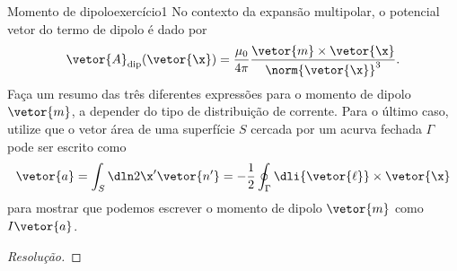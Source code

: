 \begin{exercício}{Momento de dipolo}{exercício1}
    No contexto da expansão multipolar, o potencial vetor do termo de dipolo é dado por
    \begin{equation*}
        \vetor{A}_{\mathrm{dip}}(\vetor{\x}) = \frac{\mu_0}{4\pi} \frac{\vetor{m}\times\vetor{\x}}{\norm{\vetor{\x}}^3}.
    \end{equation*}
    Faça um resumo das três diferentes expressões para o momento de dipolo \(\vetor{m}\), a depender do tipo de distribuição de corrente. Para o último caso, utilize que o vetor área de uma superfície \(S\) cercada por um acurva fechada \(\Gamma\) pode ser escrito como
    \begin{equation*}
        \vetor{a} = \int_S \dln2{\x'} \vetor{n'} =-\frac12 \oint_{\Gamma} \dli{\vetor{\ell}} \times \vetor{\x}
    \end{equation*}
    para mostrar que podemos escrever o momento de dipolo \(\vetor{m}\) como \(I\vetor{a}\).
\end{exercício}
\begin{proof}[Resolução]

\end{proof}
